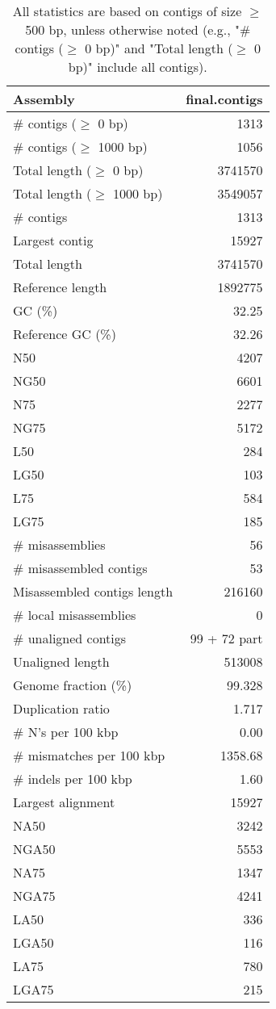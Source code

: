 \documentclass[12pt,a4paper]{article}
\begin{document}
\begin{table}[ht]
\begin{center}
\caption{All statistics are based on contigs of size $\geq$ 500 bp, unless otherwise noted (e.g., "\# contigs ($\geq$ 0 bp)" and "Total length ($\geq$ 0 bp)" include all contigs).}
\begin{tabular}{|l*{1}{|r}|}
\hline
Assembly & final.contigs \\ \hline
\# contigs ($\geq$ 0 bp) & 1313 \\ \hline
\# contigs ($\geq$ 1000 bp) & 1056 \\ \hline
Total length ($\geq$ 0 bp) & 3741570 \\ \hline
Total length ($\geq$ 1000 bp) & 3549057 \\ \hline
\# contigs & 1313 \\ \hline
Largest contig & 15927 \\ \hline
Total length & 3741570 \\ \hline
Reference length & 1892775 \\ \hline
GC (\%) & 32.25 \\ \hline
Reference GC (\%) & 32.26 \\ \hline
N50 & 4207 \\ \hline
NG50 & 6601 \\ \hline
N75 & 2277 \\ \hline
NG75 & 5172 \\ \hline
L50 & 284 \\ \hline
LG50 & 103 \\ \hline
L75 & 584 \\ \hline
LG75 & 185 \\ \hline
\# misassemblies & 56 \\ \hline
\# misassembled contigs & 53 \\ \hline
Misassembled contigs length & 216160 \\ \hline
\# local misassemblies & 0 \\ \hline
\# unaligned contigs & 99 + 72 part \\ \hline
Unaligned length & 513008 \\ \hline
Genome fraction (\%) & 99.328 \\ \hline
Duplication ratio & 1.717 \\ \hline
\# N's per 100 kbp & 0.00 \\ \hline
\# mismatches per 100 kbp & 1358.68 \\ \hline
\# indels per 100 kbp & 1.60 \\ \hline
Largest alignment & 15927 \\ \hline
NA50 & 3242 \\ \hline
NGA50 & 5553 \\ \hline
NA75 & 1347 \\ \hline
NGA75 & 4241 \\ \hline
LA50 & 336 \\ \hline
LGA50 & 116 \\ \hline
LA75 & 780 \\ \hline
LGA75 & 215 \\ \hline
\end{tabular}
\end{center}
\end{table}
\end{document}
